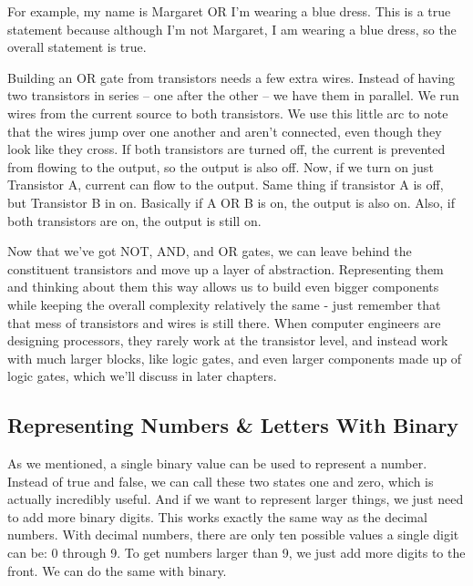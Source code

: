 \vspace{-18pt}

\be
For example, my name is Margaret OR I'm wearing a blue dress. This is a true statement because although I'm not
Margaret, I am wearing a blue dress, so the overall statement is true.
\ee

Building an OR gate from transistors needs a few extra wires. Instead of having two transistors in series -- one
after the other -- we have them in parallel. We run wires from the current source to both transistors. We use this
little arc to note that the wires jump over one another and aren't connected, even though they look like they cross.
If both transistors are turned off, the current is prevented from flowing to the output, so the output is also off.
Now, if we turn on just Transistor A, current can flow to the output. Same thing if transistor A is off, but
Transistor B in on. Basically if A OR B is on, the output is also on. Also, if both transistors are on, the output is
still on.


\vspace{-10pt}

Now that we've got NOT, AND, and OR gates, we can leave behind the constituent transistors and move up a layer of
abstraction. Representing them and thinking about them this way allows us to build even bigger components while
keeping the overall complexity relatively the same - just remember that that mess of transistors and wires is still
there. When computer engineers are designing processors, they rarely work at the transistor level, and instead work
with much larger blocks, like logic gates, and even larger components made up of logic gates, which we'll discuss in
later chapters.

\subsection{Representing Numbers \& Letters With Binary}

As we mentioned, a single binary value can be used to represent a number. Instead of true and false, we can call
these two states one and zero, which is actually incredibly useful. And if we want to represent larger things, we
just need to add more binary digits. This works exactly the same way as the decimal numbers. With decimal numbers,
there are only ten possible values a single digit can be: 0 through 9. To get numbers larger than 9, we just add more
digits to the front. We can do the same with binary.

